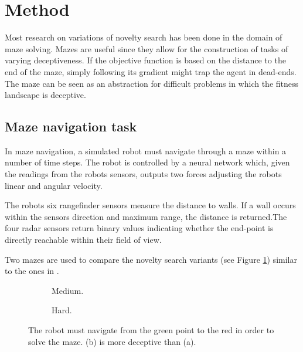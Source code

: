 \section{Method}
Most research on variations of novelty search has been done in the domain of maze solving. Mazes are useful
since they allow for the construction of tasks of varying deceptiveness. If the objective function is
based on the distance to the end of the maze, simply following its gradient might trap the agent in
dead-ends. The maze can be seen as an abstraction for difficult problems in which the fitness
landscape is deceptive.

\subsection{Maze navigation task}
In maze navigation, a simulated robot must navigate through a maze within a number of time steps.
The robot is controlled by a neural network which, given the readings from the robots sensors,
outputs two forces adjusting the robots linear and angular velocity.

The robots six rangefinder sensors measure the distance to walls. If a wall occurs within the sensors
direction and maximum range, the distance is returned.The four radar sensors return binary
values indicating whether the end-point is directly reachable within their field of view.

Two mazes are used to compare the novelty search variants (see Figure \ref{mazes}) similar to the ones in \cite{novelty_alone}.

\begin{figure}[H]
    \captionsetup[subfigure]{justification=centering}
    \centering
    \begin{mdframed}
        \begin{subfigure}[b]{0.45\textwidth}
            \centering
            \hspace*{2em}\scalebox{0.3}{}
            \caption{Medium.}
        \end{subfigure}
        \begin{subfigure}[b]{0.5\textwidth}
            \centering
            \hspace*{5em}\scalebox{0.3}{}
            \caption{Hard.}
        \end{subfigure}
    \end{mdframed}
    \caption{The robot must navigate from the green point to the red in order to solve the maze.
             (b) is more deceptive than (a).}
    \label{mazes}
\end{figure}

